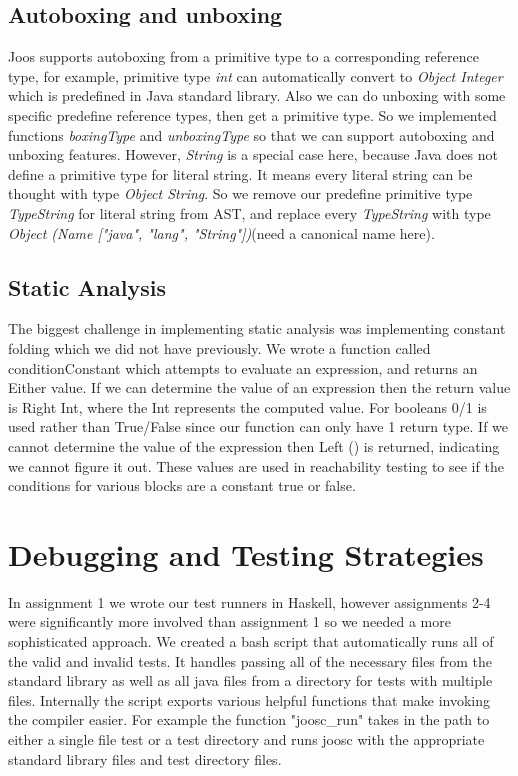 \documentclass[12pt,letterpaper]{article}
\begin{document}
\subsection{Autoboxing and unboxing}
Joos supports autoboxing from a primitive type to a corresponding reference type, for example, primitive type \emph{int} can automatically convert to \emph{Object Integer} which is predefined in Java standard library.
Also we can do unboxing with some specific predefine reference types, then get a primitive type.
So we implemented functions \emph{boxingType} and \emph{unboxingType} so that we can support autoboxing and unboxing features.
However, \emph{String} is a special case here, because Java does not define a primitive type for literal string.
It means every literal string can be thought with type \emph{Object String}.
So we remove our predefine primitive type \emph{TypeString} for literal string from AST, and replace every \emph{TypeString} with type \emph{Object (Name ["java", "lang", "String"])}(need a canonical name here).

\subsection{Static Analysis}
The biggest challenge in implementing static analysis was implementing constant folding which we did not have previously.
We wrote a function called conditionConstant which attempts to evaluate an expression, and returns an Either value.
If we can determine the value of an expression then the return value is Right Int, where the Int represents the computed value.
For booleans 0/1 is used rather than True/False since our function can only have 1 return type.
If we cannot determine the value of the expression then Left () is returned, indicating we cannot figure it out.
These values are used in reachability testing to see if the conditions for various blocks are a constant true or false.

\section{Debugging and Testing Strategies}
In assignment 1 we wrote our test runners in Haskell, however assignments 2-4 were significantly more involved than assignment 1 so we needed a more sophisticated approach.
We created a bash script that automatically runs all of the valid and invalid tests.
It handles passing all of the necessary files from the standard library as well as all java files from a directory for tests with multiple files.
Internally the script exports various helpful functions that make invoking the compiler easier.
For example the function "joosc\_run" takes in the path to either a single file test or a test directory and runs joosc with the appropriate standard library files and test directory files.
\end{document}
